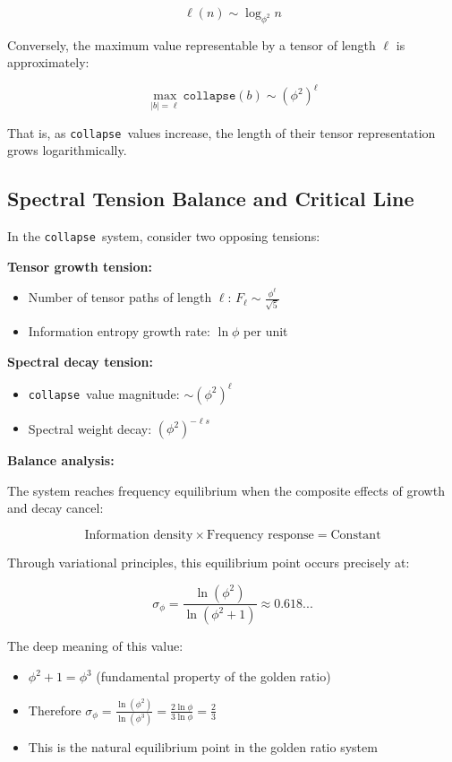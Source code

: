 \documentclass[12pt,a4paper]{article}
\theoremstyle{plain}
\theoremstyle{definition}
\theoremstyle{remark}
\newcommand{\collapse}{\texttt{collapse}}
\begin{document}
\begin{equation}
\ell(n) \sim \log_{\phi^2} n
\end{equation}

Conversely, the maximum value representable by a tensor of length $\ell$ is approximately:

\begin{equation}
\max_{|b|=\ell} \collapse(b) \sim (\phi^2)^\ell
\end{equation}

That is, as \collapse\ values increase, the length of their tensor representation grows logarithmically.

\subsection{Spectral Tension Balance and Critical Line}

In the \collapse\ system, consider two opposing tensions:

\textbf{Tensor growth tension:}
\begin{itemize}
\item Number of tensor paths of length $\ell$: $F_\ell \sim \frac{\phi^\ell}{\sqrt{5}}$
\item Information entropy growth rate: $\ln \phi$ per unit
\end{itemize}

\textbf{Spectral decay tension:}
\begin{itemize}
\item \collapse\ value magnitude: $\sim (\phi^2)^\ell$
\item Spectral weight decay: $(\phi^2)^{-\ell s}$
\end{itemize}

\textbf{Balance analysis:}

The system reaches frequency equilibrium when the composite effects of growth and decay cancel:

\begin{equation}
\text{Information density} \times \text{Frequency response} = \text{Constant}
\end{equation}

Through variational principles, this equilibrium point occurs precisely at:

\begin{equation}
\boxed{
\sigma_\phi = \frac{\ln(\phi^2)}{\ln(\phi^2 + 1)} \approx 0.618...
}
\end{equation}

The deep meaning of this value:
\begin{itemize}
\item $\phi^2 + 1 = \phi^3$ (fundamental property of the golden ratio)
\item Therefore $\sigma_\phi = \frac{\ln(\phi^2)}{\ln(\phi^3)} = \frac{2\ln \phi}{3\ln \phi} = \frac{2}{3}$
\item This is the natural equilibrium point in the golden ratio system
\end{itemize}
\end{document}
